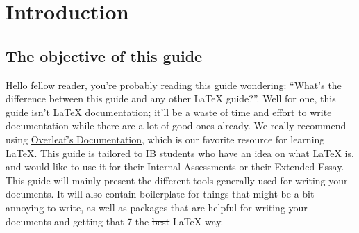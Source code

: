 %
%
%
%
%
\section{Introduction}
\subsection{The objective of this guide}
Hello fellow reader, you're probably reading this guide wondering:
``What's the difference between this guide and any other \LaTeX{} guide?''.
Well for one, this guide isn't \LaTeX{} documentation;
it'll be a waste of time and effort to write documentation while there are a lot of good ones already.
We really recommend using \href{https://www.overleaf.com/learn/latex/Main_Page}{Overleaf's Documentation},
which is our favorite resource for learning \LaTeX{}.
This guide is tailored to IB students who have an idea on what \LaTeX{} is,
and would like to use it for their Internal Assessments or their Extended Essay.
This guide will mainly present the different tools generally used for writing your documents.
It will also contain boilerplate for things that might be a bit annoying to write,
as well as packages that are helpful for writing your documents and getting that 7 the \sout{best} \LaTeX{} way.

